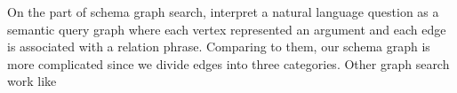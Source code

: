 On the part of schema graph search, \citeauthor{zou2014natural}  interpret a natural language question as a semantic query graph where each vertex represented an argument and each edge is associated with a relation phrase. Comparing to them, our schema graph is more complicated since we divide edges into three categories. Other graph search work like 
